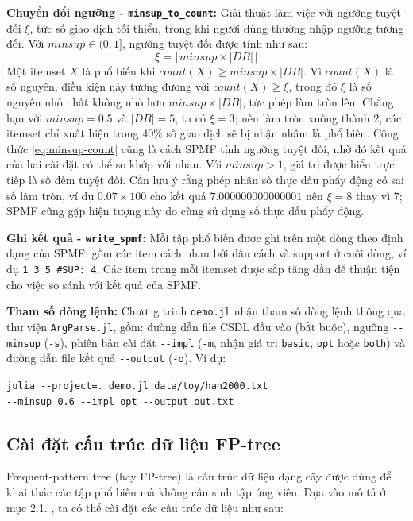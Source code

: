 \documentclass[conference]{IEEEtran}
\begin{document}
\textbf{Chuyển đổi ngưỡng - \texttt{minsup\_to\_count}:}
Giải thuật làm việc với ngưỡng tuyệt đối $\xi$, tức số giao dịch tối thiểu, trong khi người dùng thường nhập ngưỡng tương đối. Với $minsup \in (0, 1]$, ngưỡng tuyệt đối được tính như sau:
\begin{equation}
    \xi = \lceil minsup \times |DB| \rceil
    \label{eq:minsup-count}
\end{equation}
Một itemset $X$ là phổ biến khi $count(X) \geq minsup \times |DB|$. Vì $count(X)$ là số nguyên, điều kiện này tương đương với $count(X) \geq \xi$, trong đó $\xi$ là số nguyên nhỏ nhất không nhỏ hơn $minsup \times |DB|$, tức phép làm tròn lên. Chẳng hạn với $minsup = 0.5$ và $|DB| = 5$, ta có $\xi = 3$; nếu làm tròn xuống thành $2$, các itemset chỉ xuất hiện trong $40\%$ số giao dịch sẽ bị nhận nhầm là phổ biến. Công thức \eqref{eq:minsup-count} cũng là cách SPMF tính ngưỡng tuyệt đối, nhờ đó kết quả của hai cài đặt có thể so khớp với nhau. Với $minsup > 1$, giá trị được hiểu trực tiếp là số đếm tuyệt đối. Cần lưu ý rằng phép nhân số thực dấu phẩy động có sai số làm tròn, ví dụ $0.07 \times 100$ cho kết quả $7.000000000000001$ nên $\xi = 8$ thay vì $7$; SPMF cũng gặp hiện tượng này do cùng sử dụng số thực dấu phẩy động.

\textbf{Ghi kết quả - \texttt{write\_spmf}:}
Mỗi tập phổ biến được ghi trên một dòng theo định dạng của SPMF, gồm các item cách nhau bởi dấu cách và support ở cuối dòng, ví dụ \texttt{1 3 5 \#SUP: 4}. Các item trong mỗi itemset được sắp tăng dần để thuận tiện cho việc so sánh với kết quả của SPMF.

\textbf{Tham số dòng lệnh:}
Chương trình \texttt{demo.jl} nhận tham số dòng lệnh thông qua thư viện \texttt{ArgParse.jl}, gồm: đường dẫn file CSDL đầu vào (bắt buộc), ngưỡng \texttt{-{}-minsup} (\texttt{-s}), phiên bản cài đặt \texttt{-{}-impl} (\texttt{-m}, nhận giá trị \texttt{basic}, \texttt{opt} hoặc \texttt{both}) và đường dẫn file kết quả \texttt{-{}-output} (\texttt{-o}). Ví dụ:

\texttt{julia -{}-project=. demo.jl data/toy/han2000.txt}\\
\texttt{\phantom{xx}-{}-minsup 0.6 -{}-impl opt -{}-output out.txt}

\subsection{Cài đặt cấu trúc dữ liệu FP-tree}
\label{subsec:data-structures}
Frequent-pattern tree (hay FP-tree) là cấu trúc dữ liệu dạng cây được dùng để khai thác các tập phổ biến mà không cần sinh tập ứng viên. Dựa vào mô tả ở mục 2.1. \cite{han2000mining}, ta có thể cài đặt các cấu trúc dữ liệu như sau:
\end{document}
